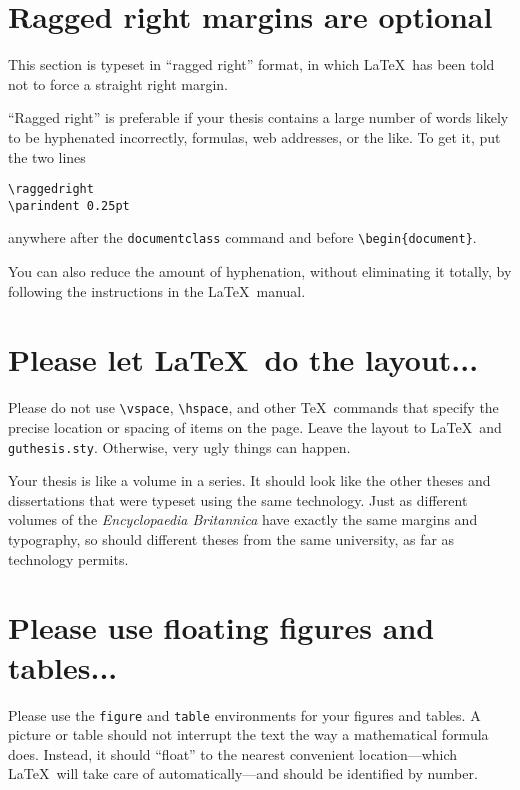 \documentclass[12pt]{report}
\begin{document}
\section{Ragged right margins are optional}

{\raggedright
\parindent 0.25in
This section is typeset in ``ragged right'' format, in which \LaTeX\ has
been told not to force a straight right margin.

``Ragged right'' is preferable if your thesis contains a large number of
words likely to be hyphenated incorrectly, formulas, web addresses, or
the like.  To get it, put the two lines
\begin{verbatim}
\raggedright
\parindent 0.25pt
\end{verbatim}
anywhere after the {\tt documentclass} command and before
\verb"\begin{document}".

You can also reduce the amount of hyphenation, without eliminating it
totally, by following the instructions in the \LaTeX\ manual.
} %

\section{Please let \LaTeX\ do the layout...}

Please do not use \verb"\vspace", \verb"\hspace", and other \TeX\ commands
that specify the precise location or spacing of items on the page.
Leave the layout to \LaTeX\ and \verb"guthesis.sty".
Otherwise, very ugly things can happen.

Your thesis is like a volume in a series.
It should look like the other theses and dissertations that were typeset
using the same technology.
Just as different volumes of the \emph{Encyclopaedia Britannica} have exactly
the same margins and typography, so should different theses from the same
university, as far as technology permits.


\section{Please use floating figures and tables...}

Please use the \verb"figure" and \verb"table" environments for your figures
and tables.
A picture or table should not interrupt the text the way a mathematical
formula does.
Instead, it should ``float'' to the nearest convenient location---which
\LaTeX\ will take care of automatically---and should be identified by
number.
\end{document}
